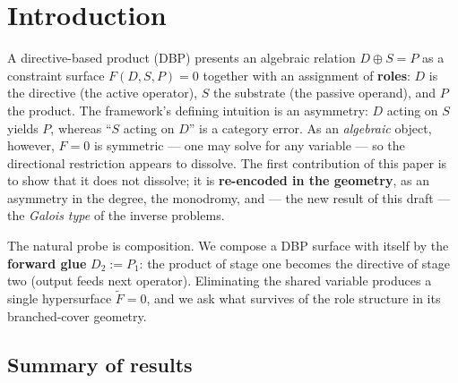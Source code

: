 \documentclass[11pt]{article}
\theoremstyle{plain}
\theoremstyle{definition}
\theoremstyle{remark}
\begin{document}
\hypertarget{introduction}{%
\section{Introduction}\label{introduction}}

A directive-based product (DBP) presents an algebraic relation \(D\oplus S = P\) as a constraint surface \(F(D,S,P)=0\) together with an assignment of \textbf{roles}: \(D\) is the directive (the active operator), \(S\) the substrate (the passive operand), and \(P\) the product. The framework's defining intuition is an asymmetry: \(D\) acting on \(S\) yields \(P\), whereas ``\(S\) acting on \(D\)'' is a category error. As an \emph{algebraic} object, however, \(F=0\) is symmetric --- one may solve for any variable --- so the directional restriction appears to dissolve. The first contribution of this paper is to show that it does not dissolve; it is \textbf{re-encoded in the geometry}, as an asymmetry in the degree, the monodromy, and --- the new result of this draft --- the \emph{Galois type} of the inverse problems.

The natural probe is composition. We compose a DBP surface with itself by the \textbf{forward glue} \(D_2 := P_1\): the product of stage one becomes the directive of stage two (output feeds next operator). Eliminating the shared variable produces a single hypersurface \(\widetilde F = 0\), and we ask what survives of the role structure in its branched-cover geometry.

\hypertarget{summary-of-results}{%
\subsection{Summary of results}\label{summary-of-results}}
\end{document}
